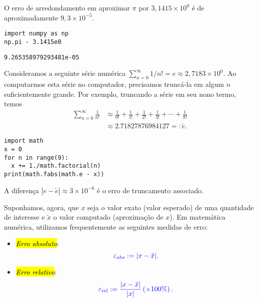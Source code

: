 \begin{ex}\label{ex:erro_de_arredondamento}
  O erro de arredondamento em aproximar $\pi$ por $3,1415\times 10^0$ é de aproximadamente $9,3\times 10^{-5}$.
  
\begin{lstlisting}
import numpy as np
np.pi - 3.1415e0
\end{lstlisting}

\begin{verbatim}
9.265358979293481e-05    
\end{verbatim}
  
\end{ex}

\begin{ex}\label{ex:erro_de_truncamento}
  Consideramos a seguinte série numérica $\sum_{n=0}^\infty 1/n! = e \approx 2,7183\times 10^0$. Ao computarmos esta série no computador, precisamos truncá-la em algum $n$ suficientemente grande. Por exemplo, truncando a série em seu nono termo, temos
  \begin{align}
    \sum_{n=0}^\infty \frac{1}{n!} &\approx \frac{1}{0!} + \frac{1}{1!} + \frac{1}{2!} + \frac{1}{3!} + \cdots + \frac{1}{8!} \\
    &\approx 2.71827876984127 =: \tilde{e}.
  \end{align}

  
\begin{lstlisting}
import math
x = 0
for n in range(9):
  x += 1./math.factorial(n)
print(math.fabs(math.e - x))
\end{lstlisting}
  
A diferença $|e - \tilde{e}| \approx 3\times 10^{-6}$ é o erro de truncamento associado.
\end{ex}

Suponhamos, agora, que $x$ seja o valor exato (valor esperado) de uma quantidade de interesse e $\tilde{x}$ o valor computado (aproximação de $x$). Em matemática numérica, utilizamos frequentemente as seguintes medidas de erro:
\begin{itemize}
  \item \hl{\emph{Erro absoluto}}:
    \begin{equation}
      \color{blue}\varepsilon_{\text{abs}} := |x - \tilde{x}|.
    \end{equation}
  \item \hl{\emph{Erro relativo}}:
    \begin{equation}
      \color{blue}\varepsilon_{\text{rel}} := \frac{|x - \tilde{x}|}{|x|}\left(\times 100\%\right).
    \end{equation}
\end{itemize}

